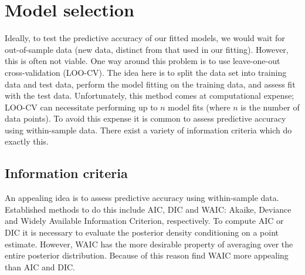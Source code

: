 \section{Model selection}
\label{sec:model_comparison}

Ideally, to test the predictive accuracy of our fitted models, we would wait
for out-of-sample data (new data, distinct from that used in our fitting).
However, this is often not viable. One way around this problem is to use
leave-one-out cross-validation (LOO-CV). The idea here is to split the data set
into training data and test data, perform the model fitting on the training
data, and assess fit with the test data.  Unfortunately, this method comes at
computational expense; LOO-CV can necessitate performing up to $n$ model fits
(where $n$ is the number of data points). To avoid this expense it is common to
assess predictive accuracy using within-sample data. There exist a variety of
information criteria which do exactly this.

\subsection{Information criteria}

An appealing idea is to assess predictive accuracy using within-sample data.
Established methods to do this include AIC, DIC and WAIC: Akaike, Deviance and
Widely Available Information Criterion, respectively. To compute AIC or DIC it
is necessary to evaluate the posterior density conditioning on a point
estimate. However, WAIC has the more desirable property of averaging over the
entire posterior distribution. Because of this reason \textcite{gelman13} find
WAIC more appealing than AIC and DIC.



